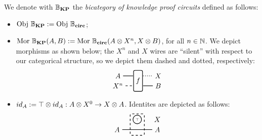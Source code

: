 \documentclass[preliminary,copyright,creativecommons,sharealike,noncommercial]{eptcs}
\begin{document}
\begin{definition}\label{def: definition of bkp}
  We denote with $\mathbb{B}_\textbf{KP}$ the \emph{bicategory of knowledge proof circuits} defined 
  as follows:
  \begin{itemize}
    \item $\operatorname{Obj} \, \mathbb{B}_\textbf{KP} := \operatorname{Obj} \, \mathbb{B}_\textbf{circ}$;
    \item $\operatorname{Mor} \, \mathbb{B}_\textbf{KP}(A,B) := \operatorname{Mor} \, \mathbb{B}_\textbf{circ}(A \otimes X^n, X \otimes B )$, for all $n \in \mathbb{N}$.
    We depict morphisms as shown below; the $X^n$ and $X$ wires are ``silent'' with respect to 
    our categorical structure, so we depict them dashed and dotted, respectively:
    \begin{equation*}
    \begin{tikzpicture}
      \node[draw, minimum height=30, minimum width=5, rounded corners=2, thick] (f) at (-1,0.5) {$f$};
      \node (A) at (-2,0.75) {$A$};
      \node (Xn0) at (-2,0.25) {$X^{n}$};
      \node (Bf) at (0,0.75) {$X$};
      \node (B) at (0,0.25) {$B$};

      \draw[thick] (A) -- (-1.25,0.75);
      \draw[dashed,thick] (Xn0) -- (-1.25,0.25);

      \draw[dotted,thick] (-0.75,0.75) -- (Bf);
      \draw[thick] (-0.75,0.25) -- (B);
    \end{tikzpicture}  
    \end{equation*}
    \item $id_{A} := \top \otimes id_{A}: A \otimes X^0 \to X \otimes A$. Identites are
    depicted as follows:
    \begin{equation*}
      \begin{tikzpicture}
        \node[draw, dashed, minimum height=30, minimum width=20, rounded corners=2, thick] (f) at (-1,0.5) {};
        \node[thick, draw, circle, radius=2pt, inner sep = 2pt] (true) at (-1,0.75) {\tiny{$\top$}};
        \node (A) at (-2,0.25) {$A$};
        \node (Bf) at (0,0.75) {$X$};
        \node (B) at (0,0.25) {$A$};
  
        \draw[thick] (A) -- (B);
  

\end{tikzpicture}
\end{equation*}
\end{itemize}
\end{definition}
\end{document}
